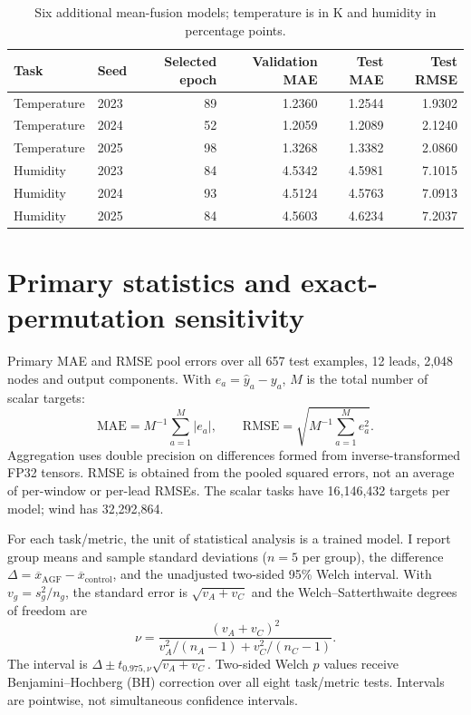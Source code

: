 \documentclass[10pt,a4paper]{article}
\begin{document}
\begin{table}[H]\centering\small\setlength{\tabcolsep}{5pt}\setlength{\parskip}{0pt}

\caption{Six additional mean-fusion models; temperature is in K and humidity in percentage points.}\label{tab:mean_models}

\begin{tabular}{llrrrr}

\toprule
Task & Seed & Selected epoch & Validation MAE & Test MAE & Test RMSE \\
\midrule

Temperature & 2023 & 89 & 1.2360 & 1.2544 & 1.9302 \\

Temperature & 2024 & 52 & 1.2059 & 1.2089 & 2.1240 \\

Temperature & 2025 & 98 & 1.3268 & 1.3382 & 2.0860 \\

Humidity & 2023 & 84 & 4.5342 & 4.5981 & 7.1015 \\

Humidity & 2024 & 93 & 4.5124 & 4.5763 & 7.0913 \\

Humidity & 2025 & 84 & 4.5603 & 4.6234 & 7.2037 \\

\bottomrule\end{tabular}\end{table}

\section{Primary statistics and exact-permutation sensitivity}
Primary MAE and RMSE pool errors over all 657 test examples, 12 leads, 2,048 nodes and output components. With $e_a=\widehat y_a-y_a$, $M$ is the total number of scalar targets:
\[
\mathrm{MAE}=M^{-1}\sum_{a=1}^{M}|e_a|,\qquad
\mathrm{RMSE}=\sqrt{M^{-1}\sum_{a=1}^{M}e_a^2}.
\]
Aggregation uses double precision on differences formed from inverse-transformed FP32 tensors. RMSE is obtained from the pooled squared errors, not an average of per-window or per-lead RMSEs. The scalar tasks have 16,146,432 targets per model; wind has 32,292,864.

For each task/metric, the unit of statistical analysis is a trained model. I report group means and sample standard deviations ($n=5$ per group), the difference $\Delta=\overline{x}_{\mathrm{AGF}}-\overline{x}_{\mathrm{control}}$, and the unadjusted two-sided 95\% Welch interval. With $v_g=s_g^2/n_g$, the standard error is $\sqrt{v_A+v_C}$ and the Welch--Satterthwaite degrees of freedom are
\[
\nu=\frac{(v_A+v_C)^2}{v_A^2/(n_A-1)+v_C^2/(n_C-1)}.
\]
The interval is $\Delta\pm t_{0.975,\nu}\sqrt{v_A+v_C}$. Two-sided Welch $p$ values receive Benjamini--Hochberg (BH) correction over all eight task/metric tests. Intervals are pointwise, not simultaneous confidence intervals.
\end{document}
